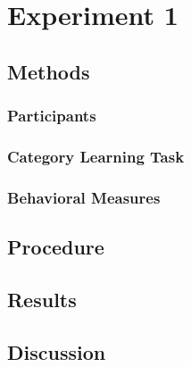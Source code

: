 \documentclass[../dissertation.tex]{subfiles}
\begin{document}
\section{Experiment 1}

\subsection{Methods}
\subsubsection{Participants}
\subsubsection{Category Learning Task}
\subsubsection{Behavioral Measures}
 
\subsection{Procedure}

\subsection{Results}

\subsection{Discussion}
\end{document}
